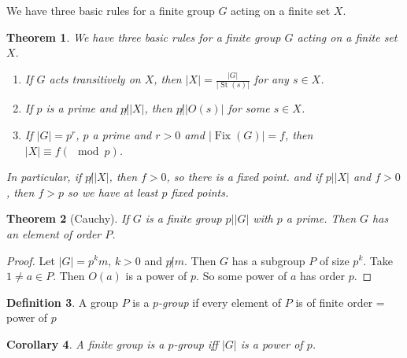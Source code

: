 \documentclass{amsart}
\newtheorem{thm}{Theorem}[section]
\newtheorem{cor}[thm]{Corollary}
\theoremstyle{definition}
\newtheorem{definition}[thm]{Definition}
\DeclareMathOperator{\St}{St}
\DeclareMathOperator{\Fix}{Fix}
\begin{document}
We have three basic rules for a finite group $G$ acting on a finite set $X$.
\begin{thm}
	We have three basic rules for a finite group $G$ acting on a finite set $X$.
	\begin{enumerate}
		\item If $G$ acts transitively on $X$, then $|X|=\frac{|G|}{|\St(s)|}$ for any $s\in X$.
		\item If $p$ is a prime and $p\not||X|$, then $p\not||O(s)|$ for some $s\in X$.
		\item If $|G|=p^r$, $p$ a prime and $r>0$ amd $|\Fix(G)|=f$, then $|X|\equiv f(\mod p)$.
	\end{enumerate}
	In particular, if $p\not||X|$, then $f>0$, so there is a fixed point. and if $p||X|$ and $f>0$, then $f>p$ so we have at least $p$ fixed points.
\end{thm}
\begin{thm}[Cauchy]
	If $G$ is a finite group $p||G|$ with $p$ a prime. Then $G$ has an element of order $P$.
\end{thm}
\begin{proof}
	Let $|G|=p^km$, $k>0$ and $p\not|m$. Then $G$ has a subgroup $P$ of size $p^k$. Take $1\not=a\in P$. Then $O(a)$ is a power of $p$. So some power of $a$ has order $p$.
\end{proof}
\begin{definition}
	A group $P$ is a \emph{$p$-group} if every element of $P$ is of finite order = power of $p$
\end{definition}
\begin{cor}
	A finite group is a $p$-group iff $|G|$ is a power of $p$.
\end{cor}
\end{document}
